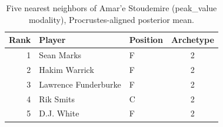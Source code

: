 \begin{table}[htbp]
  \centering\small
  \begin{tabular}{rllc}
    \toprule
    Rank & Player & Position & Archetype \\
    \midrule
    1 & Sean Marks & F & 2 \\
    2 & Hakim Warrick & F & 2 \\
    3 & Lawrence Funderburke & F & 2 \\
    4 & Rik Smits & C & 2 \\
    5 & D.J. White & F & 2 \\
    \bottomrule
  \end{tabular}
  \caption{Five nearest neighbors of Amar'e Stoudemire (peak_value modality), Procrustes-aligned posterior mean.}
  \label{tab:Amar_e_Stoudemire_neighbors_peak_value}
\end{table}

